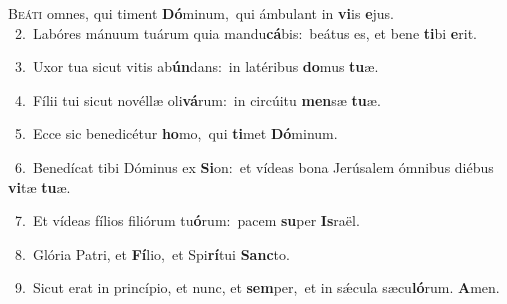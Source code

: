 \lettrine{\initial\textcolor{\initialcolor}{B}}{eáti} omnes, qui timent \textbf{Dó}\-minum,~\star qui ámbulant in \textbf{vi}\-is \textbf{e}\-jus.\\
{\numbfont\textcolor{\numbcolor}{~2.}}~Labóres mánuum tuárum quia mandu\-\textbf{cá}\-bis:~\star beátus es, et bene \textbf{ti}\-bi \textbf{e}\-rit.\par
{\numbfont\textcolor{\numbcolor}{~3.}}~Uxor tua sicut vitis ab\-\textbf{ún}\-dans:~\star in latéribus \textbf{do}\-mus \textbf{tu}\-æ.\par
{\numbfont\textcolor{\numbcolor}{~4.}}~Fílii tui sicut novéllæ oli\-\textbf{vá}\-rum:~\star in circúitu \textbf{men}\-sæ \textbf{tu}\-æ.\par
{\numbfont\textcolor{\numbcolor}{~5.}}~Ecce sic benedicétur \textbf{ho}\-mo,~\star qui \textbf{ti}\-met \textbf{Dó}\-minum.\par
{\numbfont\textcolor{\numbcolor}{~6.}}~Benedícat tibi Dóminus ex \textbf{Si}\-on:~\star et vídeas bona Jerúsalem ómnibus diébus \textbf{vi}\-tæ \textbf{tu}\-æ.\par
{\numbfont\textcolor{\numbcolor}{~7.}}~Et vídeas fílios filiórum tu\-\textbf{ó}\-rum:~\star pacem \textbf{su}\-per \textbf{Is}\-raël.\par
{\numbfont\textcolor{\numbcolor}{~8.}}~Glória Patri, et \textbf{Fí}\-lio,~\star et Spi\-\textbf{rí}\-tui \textbf{Sanc}\-to.\par
{\numbfont\textcolor{\numbcolor}{~9.}}~Sicut erat in princípio, et nunc, et \textbf{sem}\-per,~\star et in sǽcula sæcu\-\textbf{ló}\-rum. \textbf{A}\-men.\par
